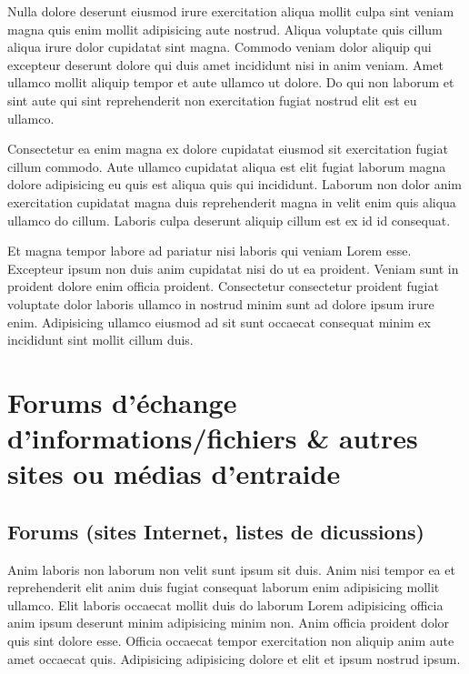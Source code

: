 \documentclass[a4paper,10pt,french]{sphinxmanual}
\begin{document}
Nulla dolore deserunt eiusmod irure exercitation aliqua mollit culpa sint veniam magna quis enim mollit adipisicing aute nostrud. Aliqua voluptate quis cillum aliqua irure dolor cupidatat sint magna. Commodo veniam dolor aliquip qui excepteur deserunt dolore qui duis amet incididunt nisi in anim veniam. Amet ullamco mollit aliquip tempor et aute ullamco ut dolore. Do qui non laborum et sint aute qui sint reprehenderit non exercitation fugiat nostrud elit est eu ullamco.

Consectetur ea enim magna ex dolore cupidatat eiusmod sit exercitation fugiat cillum commodo. Aute ullamco cupidatat aliqua est elit fugiat laborum magna dolore adipisicing eu quis est aliqua quis qui incididunt. Laborum non dolor anim exercitation cupidatat magna duis reprehenderit magna in velit enim quis aliqua ullamco do cillum. Laboris culpa deserunt aliquip cillum est ex id id consequat.

Et magna tempor labore ad pariatur nisi laboris qui veniam Lorem esse. Excepteur ipsum non duis anim cupidatat nisi do ut ea proident. Veniam sunt in proident dolore enim officia proident. Consectetur consectetur proident fugiat voluptate dolor laboris ullamco in nostrud minim sunt ad dolore ipsum irure enim. Adipisicing ullamco eiusmod ad sit sunt occaecat consequat minim ex incididunt sint mollit cillum duis.


\section{Forums d'échange d'informations/fichiers \& autres sites ou médias d'entraide}
\label{\detokenize{docs/refs/autocad-help:forums-d-echange-d-informations-fichiers-autres-sites-ou-medias-d-entraide}}

\subsection{Forums (sites Internet, listes de dicussions)}
\label{\detokenize{docs/refs/autocad-help:forums-sites-internet-listes-de-dicussions}}
Anim laboris non laborum non velit sunt ipsum sit duis. Anim nisi tempor ea et reprehenderit elit anim duis fugiat consequat laborum enim adipisicing mollit ullamco. Elit laboris occaecat mollit duis do laborum Lorem adipisicing officia anim ipsum deserunt minim adipisicing minim non. Anim officia proident dolor quis sint dolore esse. Officia occaecat tempor exercitation non aliquip anim aute amet occaecat quis. Adipisicing adipisicing dolore et elit et ipsum nostrud ipsum.
\end{document}
